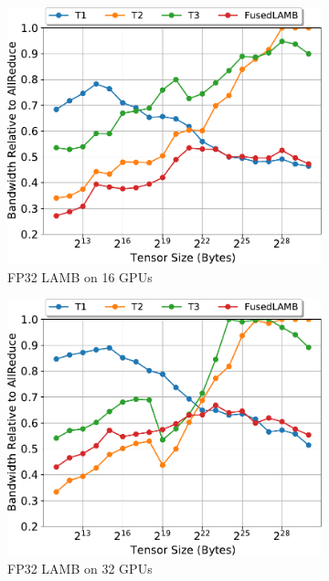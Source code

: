 \begin{figure}
  \begin{subfigure}{0.66\columnwidth}
    \includegraphics[width=\columnwidth]{figures/results-lamb-16-gpus.pdf}  
    \caption{FP32 LAMB on 16 GPUs}
  \end{subfigure}
  \begin{subfigure}{0.66\columnwidth}
    \includegraphics[width=\columnwidth]{figures/results-lamb-32-gpus.pdf}  
    \caption{FP32 LAMB on 32 GPUs}
  \end{subfigure}
  \begin{subfigure}{0.66\columnwidth}

\end{subfigure}
\end{figure}
